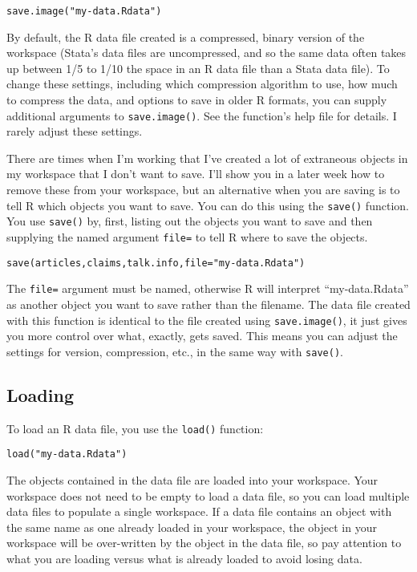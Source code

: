 \documentclass[12pt, oneside]{amsart}   	%
\begin{document}
\begin{lstlisting}
save.image("my-data.Rdata")
\end{lstlisting}

By default, the R data file created is a compressed, binary version of the workspace (Stata's data files are uncompressed, and so the same data often takes up between 1/5 to 1/10 the space in an R data file than a Stata data file). To change these settings, including which compression algorithm to use, how much to compress the data, and options to save in older R formats, you can supply additional arguments to \texttt{save.image()}. See the function's help file for details. I rarely adjust these settings.

There are times when I'm working that I've created a lot of extraneous objects in my workspace that I don't want to save. I'll show you in a later week how to remove these from your workspace, but an alternative when you are saving is to tell R which objects you want to save. You can do this using the \texttt{save()} function. You use \texttt{save()} by, first, listing out the objects you want to save and then supplying the named argument \texttt{file=} to tell R where to save the objects.

\begin{lstlisting}
save(articles,claims,talk.info,file="my-data.Rdata")
\end{lstlisting}

The \texttt{file=} argument must be named, otherwise R will interpret ``my-data.Rdata'' as another object you want to save rather than the filename. The data file created with this function is identical to the file created using \texttt{save.image()}, it just gives you more control over what, exactly, gets saved. This means you can adjust the settings for version, compression, etc., in the same way with \texttt{save()}.

\subsection{Loading}

To load an R data file, you use the \texttt{load()} function:

\begin{lstlisting}
load("my-data.Rdata")
\end{lstlisting}

The objects contained in the data file are loaded into your workspace. Your workspace does not need to be empty to load a data file, so you can load multiple data files to populate a single workspace. If a data file contains an object with the same name as one already loaded in your workspace, the object in your workspace will be over-written by the object in the data file, so pay attention to what you are loading versus what is already loaded to avoid losing data.
\end{document}
